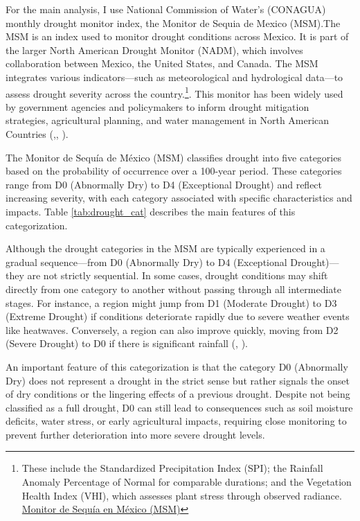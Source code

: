 \documentclass[12pt, oneside]{article}      %
\begin{document}
For the main analysis, I use National Commission of Water's (CONAGUA) monthly drought monitor index, the Monitor de Sequia de Mexico (MSM).The MSM is an index used to monitor drought conditions across Mexico. It is part of the larger North American Drought Monitor (NADM), which involves collaboration between Mexico, the United States, and Canada. The MSM integrates various indicators—such as meteorological and hydrological data—to assess drought severity across the country.\footnote{These include the Standardized Precipitation Index (SPI); the Rainfall Anomaly Percentage of Normal for comparable durations; and the Vegetation Health Index (VHI), which assesses plant stress through observed radiance. \href{https://smn.conagua.gob.mx/es/climatologia/monitor-de-sequia/monitor-de-sequia-en-mexico}{Monitor de Sequía en México (MSM)}}.  This monitor has been widely used by government agencies and policymakers to inform drought mitigation strategies, agricultural planning, and water management in North American Countries (\cite{Mardian2022},\cite{lobato2016drought}, \cite{usdrought2002}).

The Monitor de Sequía de México (MSM) classifies drought into five categories based on the probability of occurrence over a 100-year period. These categories range from D0 (Abnormally Dry) to D4 (Exceptional Drought) and reflect increasing severity, with each category associated with specific characteristics and impacts. Table \ref{tab:drought_cat} describes the main features of this categorization.



Although the drought categories in the MSM are typically experienced in a gradual sequence—from D0 (Abnormally Dry) to D4 (Exceptional Drought)—they are not strictly sequential. In some cases, drought conditions may shift directly from one category to another without passing through all intermediate stages. For instance, a region might jump from D1 (Moderate Drought) to D3 (Extreme Drought) if conditions deteriorate rapidly due to severe weather events like heatwaves. Conversely, a region can also improve quickly, moving from D2 (Severe Drought) to D0 if there is significant rainfall (\cite{lobato2016drought}, \cite{usdrought2002}). 

An important feature of this categorization is that the category D0 (Abnormally Dry) does not represent a drought in the strict sense but rather signals the onset of dry conditions or the lingering effects of a previous drought. Despite not being classified as a full drought, D0 can still lead to consequences such as soil moisture deficits, water stress, or early agricultural impacts, requiring close monitoring to prevent further deterioration into more severe drought levels.
\end{document}
